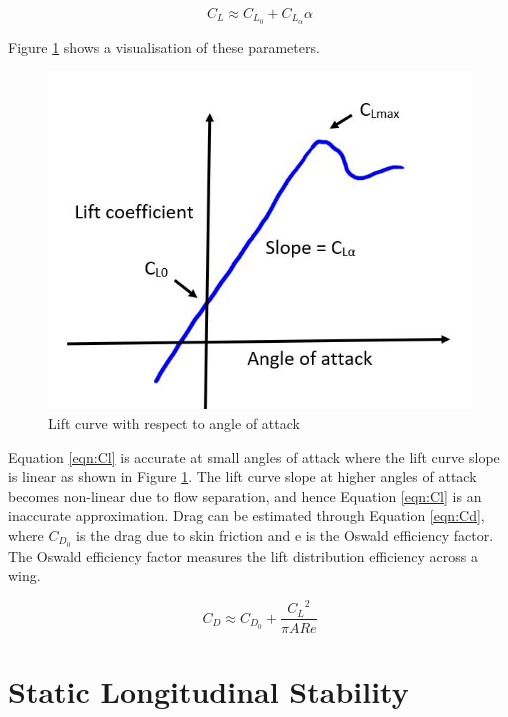 \begin{equation}
    C_L \approx C_{L_0} + C_{L_\alpha}\alpha
    \label{eqn:Cl}
\end{equation}

Figure \ref{fig:Clalpha} shows a visualisation of these parameters. 

\begin{figure}[H]
    \centering
    \includegraphics[scale = 0.8]{02_Background/Figs/liftcurveslope.JPG}
    \caption{Lift curve with respect to angle of attack}
    \label{fig:Clalpha}
\end{figure}

Equation \ref{eqn:Cl} is accurate at small angles of attack where the lift curve slope is linear as shown in Figure \ref{fig:Clalpha}. The lift curve slope at higher angles of attack becomes non-linear due to flow separation, and hence Equation \ref{eqn:Cl} is an inaccurate approximation. Drag can be estimated through Equation \ref{eqn:Cd}, where $C_{D_0}$ is the drag due to skin friction and e is the Oswald efficiency factor. The Oswald efficiency factor measures the lift distribution efficiency across a wing. 


\begin{equation}
    C_D \approx C_{D_0} + \frac{{C_L}^2}{\pi ARe}
    \label{eqn:Cd}
\end{equation}



\section{Static Longitudinal Stability}

